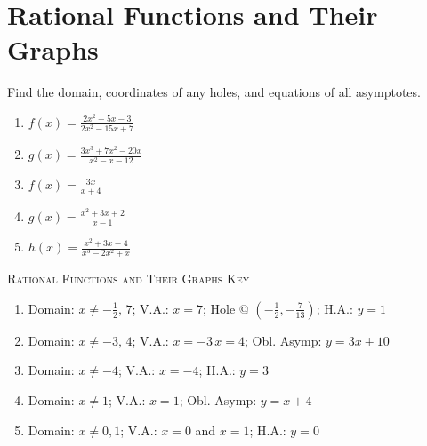 \chapter{Rational Functions and Their Graphs}

Find the domain, coordinates of any holes, and equations of all asymptotes.
\begin{enumerate}
\setlength\itemsep{10pt}
	\item $f(x) = \frac{2x^2+5x-3}{2x^2-15x+7}$
	\item $g(x) = \frac{3x^3+7x^2-20x}{x^2-x-12}$
	\item $f(x) = \frac{3x}{x+4}$
	\item $g(x) = \frac{x^2+3x+2}{x-1}$
	\item $h(x) = \frac{x^2+3x-4}{x^3-2x^2+x}$
\end{enumerate}

\newpage

\textsc{Rational Functions and Their Graphs Key}

\begin{enumerate}
    \item Domain: $x \neq -\frac{1}{2}, \, 7$; V.A.: $x=7$; Hole @ $\left(-\frac{1}{2},-\frac{7}{13}\right)$; H.A.: $y=1$
    \item Domain: $x \neq -3, \, 4$; V.A.: $x=-3 \, x = 4$; Obl. Asymp: $y = 3x+10$
    \item Domain: $x \neq -4$; V.A.: $x = -4$; H.A.: $y = 3$
    \item Domain: $x \neq 1$; V.A.: $x = 1$; Obl. Asymp: $y = x + 4$
    \item Domain: $x \neq 0, 1$; V.A.: $x = 0$ and $x = 1$; H.A.: $y = 0$ 
\end{enumerate}